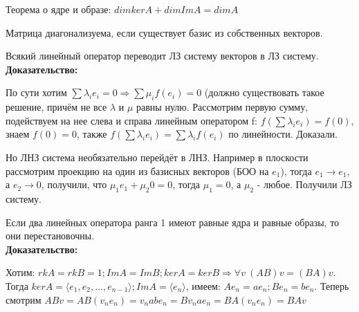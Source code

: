 \documentclass[12pt]{article}
\begin{document}
\begin{theorembox}
    Теорема о ядре и образе: $dimkerA + dimImA = dimA$
\end{theorembox}

\begin{remarkbox}
    Матрица диагонализуема, если существует базис из собственных векторов.
\end{remarkbox}

\begin{theorembox}
    Всякий линейный оператор переводит ЛЗ систему векторов в ЛЗ систему.\\

    \textbf{Доказательство:}

    По сути хотим $\sum \lambda_i e_i = 0\Rightarrow \sum \mu_i f(e_i) = 0$ (должно существовать такое решение, причём не все $\lambda$ и $\mu$ равны нулю. Рассмотрим первую сумму, подействуем на нее слева и справа линейным оператором f: $f(\sum \lambda_i e_i) = f(0)$, знаем $f(0) = 0$, также $f(\sum \lambda_i e_i) = \sum \lambda_i f(e_i)$ по линейности. Доказали.
\end{theorembox}

\begin{remarkbox}
    Но ЛНЗ система необязательно перейдёт в ЛНЗ. Например в плоскости рассмотрим проекцию на один из базисных векторов (БОО на $e_1$), тогда $e_1 \rightarrow e_1$, а $e_2 \rightarrow 0$, получили, что $\mu_1 e_1 + \mu_2 0 = 0$, тогда $\mu_1 = 0$, а $\mu_2$ - любое. Получили ЛЗ систему.
\end{remarkbox}

\begin{theorembox}
    Если два линейных оператора ранга 1 имеют равные ядра и равные образы, то они перестановочны.\\

    \textbf{Доказательство:}

    Хотим: $rkA = rkB = 1; ImA = ImB; kerA = kerB \Rightarrow \forall v \ (AB)v = (BA)v$.\\
    Тогда $kerA = \langle e_1, e_2, \dots, e_{n - 1} \rangle; ImA = \langle e_n \rangle$, имеем: $Ae_n = ae_n; Be_n = be_n$. Теперь смотрим $ABv =  AB(v_ne_n) = v_nabe_n = Bv_nae_n = BA(v_ne_n) = BAv$
\end{theorembox}
\end{document}
